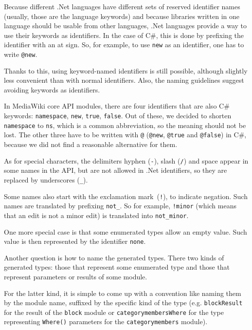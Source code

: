 \medskip

Because different .Net languages have different sets of reserved identifier names
(usually, those are the language keywords)
and because libraries written in one language should be usable from other languages,
.Net languages provide a way to use their keywords as identifiers.
In the case of C\#, this is done by prefixing the identifier with an at sign.
So, for example, to use \texttt{new} as an identifier, one has to write \lstinline{@new}.

Thanks to this, using keyword-named identifiers is still possible,
although slightly less convenient than with normal identifiers.
Also, the naming guidelines suggest avoiding keywords as identifiers.

In MediaWiki core API modules, there are four identifiers that are also C\# keywords:
\texttt{namespace}, \texttt{new}, \texttt{true}, \texttt{false}.
Out of these, we decided to shorten \texttt{namespace} to \lstinline{ns},
which is a common abbreviation, so the meaning should not be lost.
The other three have to be written with \lstinline{@} (\lstinline{@new}, \lstinline{@true} and \lstinline{@false}) in C\#,
because we did not find a reasonable alternative for them.

\medskip

As for special characters, the delimiters hyphen (\texttt{-}), slash (\texttt{/}) and space
appear in some names in the API, but are not allowed in .Net identifiers,
so they are replaced by underscores (\texttt{\_}).

Some names also start with the exclamation mark~(\texttt{!}), to indicate negation.
Such names are translated by prefixing \lstinline{not_}.
So for example, \texttt{!minor} (which means that an edit is not a minor edit)
is translated into \lstinline{not_minor}.

One more special case is that some enumerated types allow an empty value.
Such value is then represented by the identifier \lstinline{none}.

\medskip

Another question is how to name the generated types.
There two kinds of generated types:
those that represent some enumerated type and those that represent parameters or results of some module.

For the latter kind, it is simple to come up with a convention like naming them by the module name,
suffixed by the specific kind of the type
(e.g. \lstinline{blockResult} for the result of the \texttt{block} module
or \lstinline{categorymembersWhere} for the type representing \lstinline{Where()} parameters for the \texttt{categorymembers} module).

